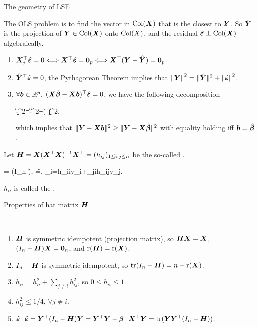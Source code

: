 \documentclass[10pt,a4paper]{book}
\begin{document}
\begin{thmbox}{The geometry of LSE}
	\begin{proposition}\label{prop:geo_LSE}
		The OLS problem is to find the vector in $\Col(\X)$ that is the closest to $\Y$.
		So $\hat{\Y}$ is the projection of $\Y\in\Col(\X)$ onto $\Col(X)$, and the residual $\hat{\bave}\perp\Col(\X)$ algebraically. 
		\begin{enumerate}
			\item $\X_j^\TT\hat{\bave}=0 \Longleftrightarrow \X^\TT\hat{\bave}=\0_p \Longleftrightarrow \X^\TT (\Y-\hat{\Y})=\0_p $.
			\item $\hat{\Y}^\TT\hat{\bave}=0$, the Pythagorean Theorem implies that $\norm{\Y}^2=\littlenorm{\hat{\Y}}^2+\norm{\hat{\bave}}^2$. 
			\item $\forall \b\in\bbR^{p}$, $(\X\hat{\bab}-\X\b)^\TT \hat{\bave}=0$, we have the following decomposition
			\begin{sequation*}
				\|\Y-\X\b\|^2=\|\Y-\X\hat{\bab}\|^2+\|\X(\hat{\bab}-\b)\|^2,
			\end{sequation*} 
			which implies that $\|\Y-\X\b\|^2\geq\|\Y-\X\hat{\bab}\|^2$ with equality holding iff $\b=\hat{\bab}$. 
		\end{enumerate}
		
	\end{proposition}
\end{thmbox}
Let $\H=\X(\X^\TT \X)^{-1}\X^\TT=(h_{ij})_{1\leq i,j\leq n}$ be the so-called .

\begin{salign*}
	\hat{\bave}= (I_n-\H)\Y, \qquad
	\hat{\Y}=\H\Y, \qquad {}_i=h_{ii}y_i+\sum_{j\neq i}h_{ij}y_j.
\end{salign*}
$h_{ii}$ is called the . 
 
\begin{thmbox}{Properties of hat matrix $\H$}
\begin{proposition}\label{prop:OLS_H}\
	\begin{enumerate}
		\item $\H$ is symmetric idempotent (projection matrix), so $\H\X=\X$, $(I_n-\H)\X=\0_n$, and $\rmr(\H)=\rmr(\X)$.   
		\item $I_n-\H$ is symmetric idempotent, so $\tr(I_n-\H)=n-\rmr(\X)$. 
		\item $h_{ii}=h_{ii}^2+\sum_{j\neq i}h_{ij}^2$, so $0\leq h_{ii}\leq 1$.  
		\item $h_{ij}^2\leq 1/4$, $\forall j\neq i$.  
		\item $\hat{\bave}^\TT\hat{\bave}=\Y^\TT(I_n-\H)\Y=\Y^\TT\Y-\hat{\bab}^\TT \X^\TT \Y=\tr(\Y\Y^\TT(I_n-\H))$. 
	\end{enumerate}
\end{proposition}
\end{thmbox}
\end{document}
